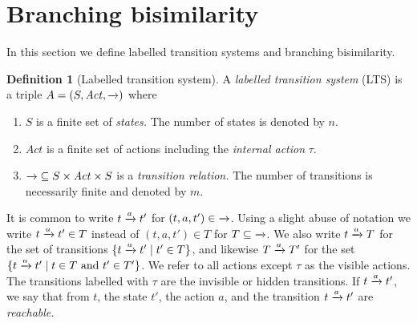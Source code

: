 \documentclass[a4paper,10pt]{article}
\theoremstyle{definition}
\newtheorem{definition}{Definition}[section]
\theoremstyle{plain}
\newcommand{\pijl}[1]{\mathrel{\text{$\xrightarrow{\smash[t]{#1}}$}}}
\newcommand{\remark}[1]{}
\newcommand{\dnj}[1]{\remark{\textcolor{red}{David: #1}}}
\begin{document}


\section{Branching bisimilarity}
\label{sec:preliminaries}
In this section we define labelled transition systems and branching bisimilarity.


\begin{definition}[Labelled transition system]
\label{dn:lts}
A \emph{labelled transition system} ({LTS}) is a triple
$A=(S,\mathit{Act}, \mathord{\pijl{}})$ where
\begin{enumerate}
\item
$S$ is a finite set of \emph{states.} The number of states is denoted by $n$.
\item
$\mathit{Act}$ is a finite set of actions including the \emph{internal action} $\tau$.
\item
$\mathord{\pijl{}} \subseteq S\times \mathit{Act}\times S$ is
a \emph{transition relation.} The number of transitions is necessarily finite and denoted by $m$.
\end{enumerate}
\end{definition}
%
\noindent%
It is common to write $t\pijl{a}t'$ for $(t,a,t')\in\mathord{\pijl{}}$. Using a slight abuse of notation we write $t\pijl{a}t' \in T$ instead of $(t,a,t') \in T$ for $T \subseteq \mathord{\pijl{}}$.
We also write $t\pijl{a}T$ for the set of transitions $\{ t \pijl{a} t' \mid t' \in T \}$, and likewise $T \pijl{a}T'$ for the set $\{ t \pijl{a} t' \mid t \in T\ \text{and}\ t' \in T' \}$.
We refer to all actions except $\tau$ as
the visible actions. The transitions labelled with $\tau$ are the invisible or hidden transitions.
If $t\pijl{a} t'$, we say that from $t$, the state $t'$, the action $a$, and the transition $t\pijl{a} t'$ are \emph{reachable.}

\end{document}
